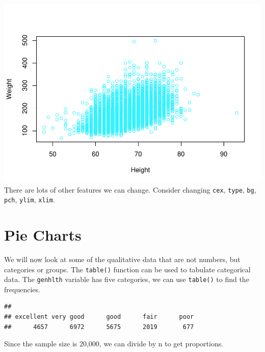 \documentclass[
]{book}
\newenvironment{Shaded}{\begin{snugshade}}{\end{snugshade}}
\newcommand{\DecValTok}[1]{\textcolor[rgb]{0.00,0.00,0.81}{#1}}
\newcommand{\KeywordTok}[1]{\textcolor[rgb]{0.13,0.29,0.53}{\textbf{#1}}}
\newcommand{\NormalTok}[1]{#1}
\newcommand{\OperatorTok}[1]{\textcolor[rgb]{0.81,0.36,0.00}{\textbf{#1}}}
\begin{document}
\includegraphics{_main_files/figure-latex/unnamed-chunk-180-1.pdf}
There are lots of other features we can change. Consider changing \texttt{cex}, \texttt{type}, \texttt{bg}, \texttt{pch}, \texttt{ylim}, \texttt{xlim}.

\hypertarget{pie-charts}{%
\section{Pie Charts}\label{pie-charts}}

We will now look at some of the qualitative data that are not numbers, but categories or groups. The \texttt{table()} function can be used to tabulate categorical data. The \texttt{genhlth} variable has five categories, we can use \texttt{table()} to find the frequencies.

\begin{Shaded}
\end{Shaded}

\begin{verbatim}
## 
## excellent very good      good      fair      poor 
##      4657      6972      5675      2019       677
\end{verbatim}

Since the sample size is 20,000, we can divide by n to get proportions.

\begin{Shaded}
\end{Shaded}
\end{document}
